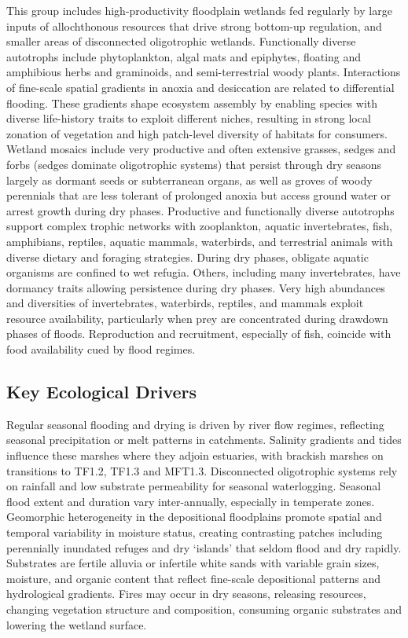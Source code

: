 \documentclass[
  letterpaper,
  DIV=11,
  numbers=noendperiod]{scrartcl}
\begin{document}
This group includes high-productivity floodplain wetlands fed regularly
by large inputs of allochthonous resources that drive strong bottom-up
regulation, and smaller areas of disconnected oligotrophic wetlands.
Functionally diverse autotrophs include phytoplankton, algal mats and
epiphytes, floating and amphibious herbs and graminoids, and
semi-terrestrial woody plants. Interactions of fine-scale spatial
gradients in anoxia and desiccation are related to differential
flooding. These gradients shape ecosystem assembly by enabling species
with diverse life-history traits to exploit different niches, resulting
in strong local zonation of vegetation and high patch-level diversity of
habitats for consumers. Wetland mosaics include very productive and
often extensive grasses, sedges and forbs (sedges dominate oligotrophic
systems) that persist through dry seasons largely as dormant seeds or
subterranean organs, as well as groves of woody perennials that are less
tolerant of prolonged anoxia but access ground water or arrest growth
during dry phases. Productive and functionally diverse autotrophs
support complex trophic networks with zooplankton, aquatic
invertebrates, fish, amphibians, reptiles, aquatic mammals, waterbirds,
and terrestrial animals with diverse dietary and foraging strategies.
During dry phases, obligate aquatic organisms are confined to wet
refugia. Others, including many invertebrates, have dormancy traits
allowing persistence during dry phases. Very high abundances and
diversities of invertebrates, waterbirds, reptiles, and mammals exploit
resource availability, particularly when prey are concentrated during
drawdown phases of floods. Reproduction and recruitment, especially of
fish, coincide with food availability cued by flood regimes.

\subsection{Key Ecological Drivers}\label{key-ecological-drivers-106}

Regular seasonal flooding and drying is driven by river flow regimes,
reflecting seasonal precipitation or melt patterns in catchments.
Salinity gradients and tides influence these marshes where they adjoin
estuaries, with brackish marshes on transitions to TF1.2, TF1.3 and
MFT1.3. Disconnected oligotrophic systems rely on rainfall and low
substrate permeability for seasonal waterlogging. Seasonal flood extent
and duration vary inter-annually, especially in temperate zones.
Geomorphic heterogeneity in the depositional floodplains promote spatial
and temporal variability in moisture status, creating contrasting
patches including perennially inundated refuges and dry `islands' that
seldom flood and dry rapidly. Substrates are fertile alluvia or
infertile white sands with variable grain sizes, moisture, and organic
content that reflect fine-scale depositional patterns and hydrological
gradients. Fires may occur in dry seasons, releasing resources, changing
vegetation structure and composition, consuming organic substrates and
lowering the wetland surface.
\end{document}
